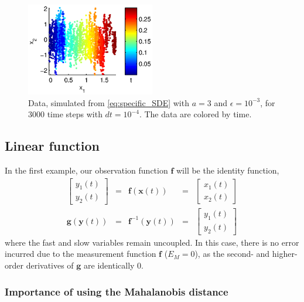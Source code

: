 \begin{figure}[t]
\centering
\includegraphics[width=0.5\textwidth]{data_init}
%
\caption[Multiscale data]{Data, simulated from \eqref{eq:specific_SDE} with $a=3$ and $\epsilon = 10^{-3}$, for $3000$ time steps with $dt = 10^{-4}$. The data are colored by time.}
\label{fig:initial_data}
\end{figure}

\subsection{Linear function} \label{subsec:linear_example}

In the first example, our observation function $\mathbf{f}$ will be the identity function,
%
\begin{equation} \label{eq:linear_transform}
\begin{aligned}
\begin{bmatrix}
y_1(t) \\ y_2(t)
\end{bmatrix} &=&
\mathbf{f}(\mathbf{x}(t)) &=&
\begin{bmatrix} x_1(t) \\ x_2(t) \end{bmatrix} \\
\mathbf{g}(\mathbf{y}(t)) &=& \mathbf{f}^{-1} (\mathbf{y}(t)) &=& \begin{bmatrix} y_1(t) \\ y_2(t) \end{bmatrix}
\end{aligned}
\end{equation}
%
where the fast and slow variables remain uncoupled.
%
In this case, there is no error incurred due to the measurement function $\mathbf{f}$ ($E_M = 0$), as the second- and higher-order derivatives of $\mathbf{g}$ are identically 0.

\subsubsection{Importance of using the Mahalanobis distance}

